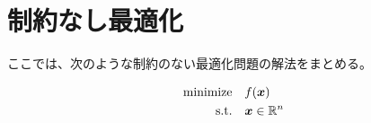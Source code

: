 %

\section{制約なし最適化}

ここでは、次のような制約のない最適化問題の解法をまとめる。

\begin{align}
    \text{minimize} \hspace{1em}& f(\bm{x}) \\
    \text{s.t.} \hspace{1em}& \bm{x} \in \mathbb{R}^n
\end{align}


